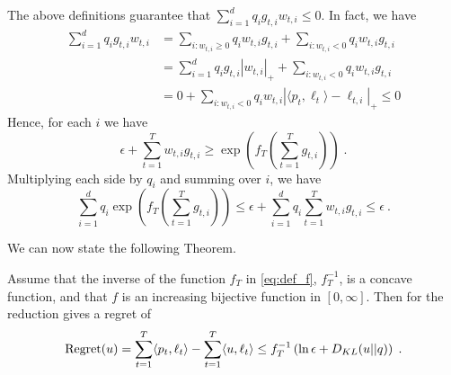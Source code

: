 The above definitions guarantee that $\sum_{i=1}^d q_i g_{t,i} w_{t,i} \le 0$. In fact, we have
\begin{align*}
\sum_{i=1}^d q_i g_{t,i} w_{t,i}
& = \sum_{i:w_{t,i}\ge 0} q_i w_{t,i} g_{t,i} + \sum_{i:w_{t,i} < 0} q_i w_{t,i} g_{t,i} \\
& = \sum_{i=1}^d q_i g_{t,i} |w_{t,i}|_+ + \sum_{i:w_{t,i} < 0} q_i w_{t,i} g_{t,i} \\
& = 0 + \sum_{i:w_{t,i} < 0} q_i w_{t,i} |\langle p_t, \ell_t\rangle - \ell_{t,i}|_+ \le 0
\end{align*}
Hence, for each $i$ we have
\[
\epsilon + \sum_{t=1}^T w_{t,i} g_{t,i} \geq \exp\left(f_T \left( \sum_{t=1}^T g_{t,i} \right)\right) \; .
\]
Multiplying each side by $q_i$ and summing over $i$, we have
\begin{equation}
\label{eq:bounded_potential}
\sum_{i=1}^d q_i \exp\left(f_T\left(\sum_{t=1}^T g_{t,i} \right)\right) \leq \epsilon + \sum_{i=1}^d q_i \sum_{t=1}^T w_{t,i} g_{t,i} \le \epsilon~.
\end{equation}

We can now state the following Theorem.
\begin{theorem}
\label{theo:expert_reduction}
Assume that the inverse of the function $f_T$ in \eqref{eq:def_f}, $f_T^{-1}$, is a concave function, and that $f$ is an increasing bijective function in $[0,\infty]$.
Then for the reduction gives a regret of 
\[
\operatorname{Regret}(u) = \sum_{t=1}^T \langle p_t, \ell_t \rangle - \sum_{t=1}^T \langle u, \ell_t \rangle \leq f_T^{-1}\left(\ln \epsilon + D_{KL}(u||q)\right) \;.
\]
\end{theorem}